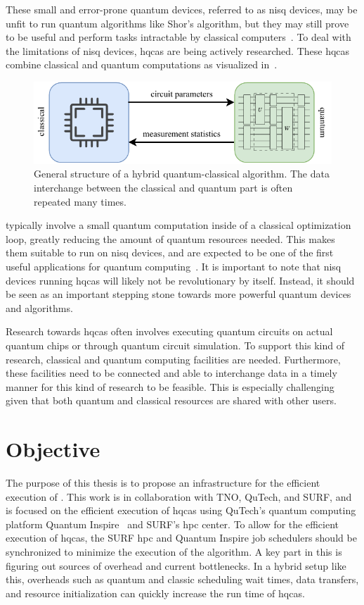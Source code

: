 These small and error-prone quantum devices, referred to as \gls{nisq} devices, may be unfit to run quantum algorithms like Shor's algorithm, but they may still prove to be useful and perform tasks intractable by classical computers~\cite{preskill2018quantum}.
To deal with the limitations of \gls{nisq} devices, \glspl{hqca} are being actively researched.
These \glspl{hqca} combine classical and quantum computations as visualized in~.
\begin{figure}[ht]
    \centering
    \includegraphics[width=0.7\linewidth]{figures/hybrid-quantum-algorithm.pdf}
    \caption[General structure of a hybrid quantum-classical algorithm.]{General structure of a hybrid quantum-classical algorithm. The data interchange between the classical and quantum part is often repeated many times.}
    \label{fig:hybrid-quantum-classical}
\end{figure}
 typically involve a small quantum computation inside of a classical optimization loop, greatly reducing the amount of quantum resources needed.
This makes them suitable to run on \gls{nisq} devices, and are expected to be one of the first useful applications for quantum computing~\cite{endo2021hybrid}.
It is important to note that \gls{nisq} devices running \glspl{hqca} will likely not be revolutionary by itself.
Instead, it should be seen as an important stepping stone towards more powerful quantum devices and algorithms.

Research towards \glspl{hqca} often involves executing quantum circuits on actual quantum chips or through quantum circuit simulation.
To support this kind of research, classical and quantum computing facilities are needed.
Furthermore, these facilities need to be connected and able to interchange data in a timely manner for this kind of research to be feasible.
This is especially challenging given that both quantum and classical resources are shared with other users.


\section{Objective}
The purpose of this thesis is to propose an infrastructure for the efficient execution of .
This work is in collaboration with TNO, QuTech, and SURF, and is focused on the efficient execution of \glspl{hqca} using QuTech's quantum computing platform Quantum Inspire~\cite{last2020quantum} and SURF's \gls{hpc} center.
To allow for the efficient execution of \glspl{hqca}, the SURF \gls{hpc} and Quantum Inspire job schedulers should be synchronized to minimize the execution of the algorithm.
A key part in this is figuring out sources of overhead and current bottlenecks.
In a hybrid setup like this, overheads such as quantum and classic scheduling wait times, data transfers, and resource initialization can quickly increase the run time of \glspl{hqca}.

